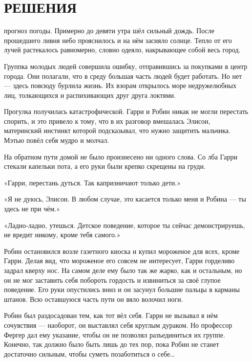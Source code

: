 \documentclass[a4paper,12pt]{book}
\begin{document}
\chapter{РЕШЕНИЯ}
\noindent{} прогноз погоды. Примерно до девяти утра шёл сильный дождь. После прошедшего ливня небо прояснилось и на нём засияло солнце. Тепло от его лучей растекалось равномерно, словно одеяло, накрывающее собой весь город.
\par
Группка молодых людей совершила ошибку, отправившись за покупками в центр города. Они полагали, что в среду большая часть людей будет работать. Но нет — здесь повсюду бурлила жизнь. Их взорам открылось море недружелюбных лиц, толкающихся и распихивающих друг друга локтями.\\
\par
Прогулка получилась катастрофической. Гарри и Робин никак не могли перестать спорить, и это привело к тому, что в их разговор вмешалась Элисон, материнский инстинкт которой подсказывал, что нужно защитить мальчика. Мэтью повёл себя мудро и молчал.
\par
На обратном пути домой не было произнесено ни одного слова. Со лба Гарри стекали капельки пота, а его руки были крепко скрещены на груди.
\par
«Гарри, перестань дуться. Так капризничают только дети.»
\par
«Я не дуюсь, Элисон. В любом случае, это касается только меня и Робина — ты здесь не при чём.»
\par
«Ладно-ладно, утешься. Детское поведение, которое ты сейчас демонстрируешь, не вредит никому, кроме тебя самого.»
\par
Робин остановился возле газетного киоска и купил мороженое для всех, кроме Гарри. Делая вид, что мороженое его совсем не интересует, Гарри горделиво задрал кверху нос. На самом деле ему было так же жарко, как и остальным, но он не мог заставить себя побороть гордость и извиниться за своё глупое поведение. Его руки опустились вниз и он засунул большие пальцы в карманы штанов. Всю оставшуюся часть пути он вяло волочил ноги.
\par
Робин был раздосадован тем, как тот вёл себя. Гарри не вызывал в нём сочувствия — наоборот, он выставлял себя круглым дураком. Но профессор Фергер дал ему указание, чтобы он не позволял разъединиться их группе. Конечно, так должно было быть лишь до тех пор, пока Робин не станет достаточно сильным, чтобы суметь позаботиться о себе…\\
\end{document}
